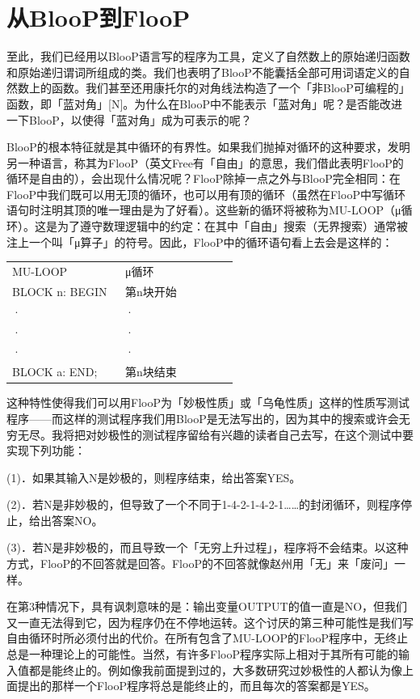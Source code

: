 \documentclass[
  12pt,
  twoside,
  openright,
  oldfontcommands,
]{memoir}
\begin{document}
\section{从BlooP到FlooP}

至此，我们已经用以BlooP语言写的程序为工具，定义了自然数上的原始递归函数和原始递归谓词所组成的类。我们也表明了BlooP不能囊括全部可用词语定义的自然数上的函数。我们甚至还用康托尔的对角线法构造了一个「非BlooP可编程的」函数，即「蓝对角」{[}N{]}。为什么在BlooP中不能表示「蓝对角」呢？是否能改进一下BlooP，以使得「蓝对角」成为可表示的呢？

BlooP的根本特征就是其中循环的有界性。如果我们抛掉对循环的这种要求，发明另一种语言，称其为FlooP（英文Free有「自由」的意思，我们借此表明FlooP的循环是自由的），会出现什么情况呢？FlooP除掉一点之外与BlooP完全相同：在FlooP中我们既可以用无顶的循环，也可以用有顶的循环（虽然在FlooP中写循环语句时注明其顶的唯一理由是为了好看）。这些新的循环将被称为MU-LOOP（μ循环）。这是为了遵守数理逻辑中的约定：在其中「自由」搜索（无界搜索）通常被注上一个叫「μ算子」的符号。因此，FlooP中的循环语句看上去会是这样的：

\begin{longtable}[]{>{\raggedright\arraybackslash}p{0.47\linewidth} >{\raggedright\arraybackslash}p{0.47\linewidth}}
\toprule\noalign{}
\endhead
\bottomrule\noalign{}
\endlastfoot
MU-LOOP & μ循环 \\
BLOCK n: BEGIN & 第n块开始 \\
· & · \\
· & · \\
· & · \\
BLOCK a: END; & 第n块结束 \\
\end{longtable}

这种特性使得我们可以用FlooP为「妙极性质」或「乌龟性质」这样的性质写测试程序------而这样的测试程序我们用BlooP是无法写出的，因为其中的搜索或许会无穷无尽。我将把对妙极性的测试程序留给有兴趣的读者自己去写，在这个测试中要实现下列功能：

(1)．如果其输入N是妙极的，则程序结束，给出答案YES。

(2)．若N是非妙极的，但导致了一个不同于1-4-2-1-4-2-1\ldots\ldots 的封闭循环，则程序停止，给出答案NO。

(3)．若N是非妙极的，而且导致一个「无穷上升过程」，程序将不会结束。以这种方式，FlooP的不回答就是回答。FlooP的不回答就像赵州用「无」来「废问」一样。

在第3种情况下，具有讽刺意味的是：输出变量OUTPUT的值一直是NO，但我们又一直无法得到它，因为程序仍在不停地运转。这个讨厌的第三种可能性是我们写自由循环时所必须付出的代价。在所有包含了MU-LOOP的FlooP程序中，无终止总是一种理论上的可能性。当然，有许多FlooP程序实际上相对于其所有可能的输入值都是能终止的。例如像我前面提到过的，大多数研究过妙极性的人都认为像上面提出的那样一个FlooP程序将总是能终止的，而且每次的答案都是YES。
\end{document}
